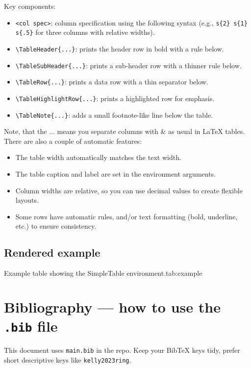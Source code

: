 \documentclass[nonacm, sigconf, balance=true]{acmart}
\begin{document}
    Key components:
    \begin{itemize}
        \item \verb|<col spec>|: column specification using the following syntax (e.g., \texttt{s\{2\} s\{1\} s\{.5\}} for three columns with relative widths).
        \item \verb|\TableHeader{...}|: prints the header row in bold with a rule below.
        \item \verb|\TableSubHeader{...}|: prints a sub-header row with a thinner rule below.
        \item \verb|\TableRow{...}|: prints a data row with a thin separator below.
        \item \verb|\TableHighlightRow{...}|: prints a highlighted row for emphasis.
        \item \verb|\TableNote{...}|: adds a small footnote-like line below the table.
    \end{itemize}

    Note, that the ... means you separate columns with \& as usual in LaTeX tables. There are also a couple of automatic features:
    \begin{itemize}
        \item The table width automatically matches the text width.
        \item The table caption and label are set in the environment arguments.
        \item Column widths are relative, so you can use decimal values to create flexible layouts.
        \item Some rows have automatic rules, and/or text formatting (bold, underline, etc.) to ensure consistency.
    \end{itemize}

    \subsection*{Rendered example}
    \begin{SimpleTable}[s{1} s{1} s{1}]{Example table showing the SimpleTable environment.}{tab:example}
    \end{SimpleTable}



    \section{Bibliography — how to use the \texttt{.bib} file}
    This document uses \texttt{main.bib} in the repo. Keep your BibTeX keys tidy, prefer short descriptive keys like \verb|kelly2023ring|.
\end{document}
